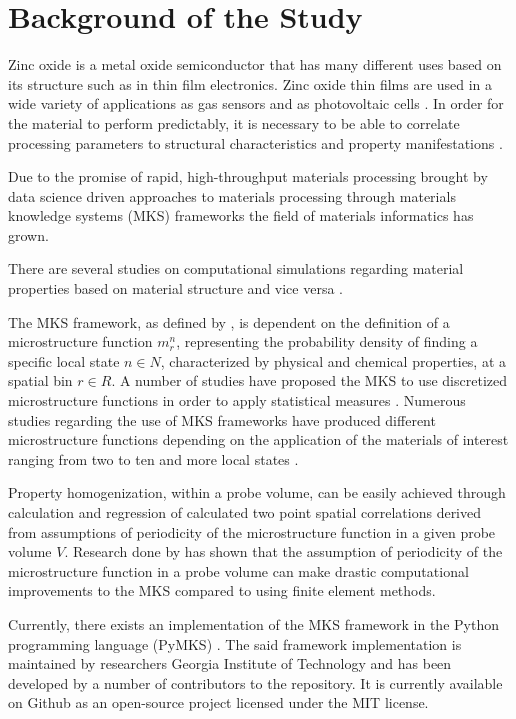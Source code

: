\section{Background of the Study}
Zinc oxide is a metal oxide semiconductor that has many different uses based on its structure such as in thin film electronics.
Zinc oxide thin films are used in a wide variety of applications as gas sensors \cite{florido17} and as photovoltaic cells \cite{fetsense}. In order for the material to perform predictably, it is necessary to be able to correlate processing parameters to structural characteristics and property manifestations \cite{florido17, fetsense}.

Due to the promise of rapid, high-throughput materials processing brought by data science driven approaches to materials processing through materials knowledge systems (MKS) frameworks \cite{gupta15, sun17, yabansu14} the field of materials informatics has grown.

There are several studies on computational simulations regarding material properties based on material structure and vice versa \cite{gupta15, yabansu14}.

The MKS framework, as defined by , is dependent on the definition of a microstructure function $m_r^n$, representing the probability density of finding a specific local state $n \in N$, characterized by physical and chemical properties, at a spatial bin $r \in R$. A number of studies have proposed the MKS to use discretized microstructure functions in order to apply statistical measures \cite{gupta15, sun17, yabansu14}. Numerous studies regarding the use of MKS frameworks have produced different microstructure functions depending on the application of the materials of interest ranging from two to ten and more local states \cite{gupta15, sun17, yabansu14}. 

Property homogenization, within a probe volume, can be easily achieved through calculation and regression of calculated two point spatial correlations derived from assumptions of periodicity of the microstructure function in a given probe volume $V$. Research done by  has shown that the assumption of periodicity of the microstructure function in a probe volume can make drastic computational improvements to the MKS compared to using finite element methods.

Currently, there exists an implementation of the MKS framework in the Python programming language (PyMKS) \cite{pymks}. The said framework implementation is maintained by researchers Georgia Institute of Technology and has been developed by a number of contributors to the repository. It is currently available on Github as an open-source project licensed under the MIT license.

